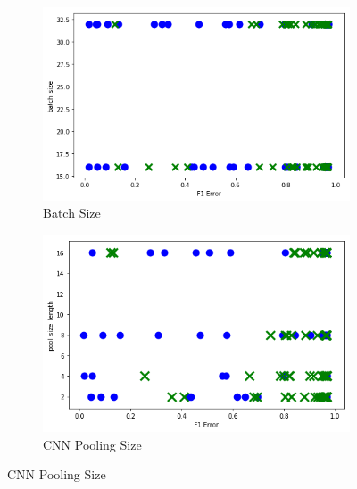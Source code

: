 \begin{figure}[H]
     \begin{subfigure}[b]{0.49\textwidth}
         \centering
         \includegraphics[width=\textwidth]{images/cnn_batch_size_dummy.png}
         \caption{Batch Size}
         \label{fig:cnn_batch_size_learning}
     \end{subfigure}
     \hfill
     \begin{subfigure}[b]{0.49\textwidth}
         \centering
         \includegraphics[width=\textwidth]{images/cnn_pooling_size_dummy.png}
         \caption{CNN Pooling Size}
         \label{fig:cnn_dense_layers_learning}
     \end{subfigure}


\end{figure}

